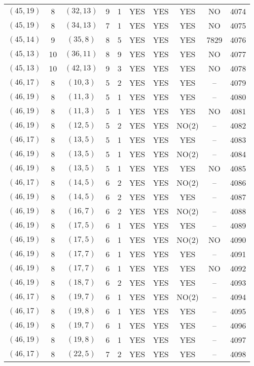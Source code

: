 \begin{longtable}{|c|c|c|c|c|c|c|c|c|c|}
$(45, 19)$ & 8 & $(32, 13)$ & 9 & 1 & YES & YES & YES & NO & 4074\\
$(45, 19)$ & 8 & $(34, 13)$ & 7 & 1 & YES & YES & YES & NO & 4075\\
$(45, 14)$ & 9 & $(35, 8)$ & 8 & 5 & YES & YES & YES & 7829 & 4076\\
$(45, 13)$ & 10 & $(36, 11)$ & 8 & 9 & YES & YES & YES & NO & 4077\\
$(45, 13)$ & 10 & $(42, 13)$ & 9 & 3 & YES & YES & YES & NO & 4078\\
$(46, 17)$ & 8 & $(10, 3)$ & 5 & 2 & YES & YES & YES & -- & 4079\\
$(46, 19)$ & 8 & $(11, 3)$ & 5 & 1 & YES & YES & YES & -- & 4080\\
$(46, 19)$ & 8 & $(11, 3)$ & 5 & 1 & YES & YES & YES & NO & 4081\\
$(46, 19)$ & 8 & $(12, 5)$ & 5 & 2 & YES & YES & NO(2) & -- & 4082\\
$(46, 17)$ & 8 & $(13, 5)$ & 5 & 1 & YES & YES & YES & -- & 4083\\
$(46, 19)$ & 8 & $(13, 5)$ & 5 & 1 & YES & YES & NO(2) & -- & 4084\\
$(46, 19)$ & 8 & $(13, 5)$ & 5 & 1 & YES & YES & YES & NO & 4085\\
$(46, 17)$ & 8 & $(14, 5)$ & 6 & 2 & YES & YES & NO(2) & -- & 4086\\
$(46, 19)$ & 8 & $(14, 5)$ & 6 & 2 & YES & YES & YES & -- & 4087\\
$(46, 19)$ & 8 & $(16, 7)$ & 6 & 2 & YES & YES & NO(2) & -- & 4088\\
$(46, 19)$ & 8 & $(17, 5)$ & 6 & 1 & YES & YES & YES & -- & 4089\\
$(46, 19)$ & 8 & $(17, 5)$ & 6 & 1 & YES & YES & NO(2) & NO & 4090\\
$(46, 19)$ & 8 & $(17, 7)$ & 6 & 1 & YES & YES & YES & -- & 4091\\
$(46, 19)$ & 8 & $(17, 7)$ & 6 & 1 & YES & YES & YES & NO & 4092\\
$(46, 19)$ & 8 & $(18, 7)$ & 6 & 2 & YES & YES & YES & -- & 4093\\
$(46, 17)$ & 8 & $(19, 7)$ & 6 & 1 & YES & YES & NO(2) & -- & 4094\\
$(46, 17)$ & 8 & $(19, 8)$ & 6 & 1 & YES & YES & YES & -- & 4095\\
$(46, 19)$ & 8 & $(19, 7)$ & 6 & 1 & YES & YES & YES & -- & 4096\\
$(46, 19)$ & 8 & $(19, 8)$ & 6 & 1 & YES & YES & YES & -- & 4097\\
$(46, 17)$ & 8 & $(22, 5)$ & 7 & 2 & YES & YES & YES & -- & 4098\\

\end{longtable}
